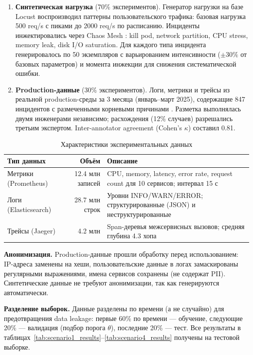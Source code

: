 \begin{enumerate}
    \item \textbf{Синтетическая нагрузка} (70\% экспериментов). Генератор нагрузки на базе Locust воспроизводил паттерны пользовательского трафика: базовая нагрузка 500 req/s с пиками до 2000 req/s по расписанию. Инциденты инжектировались через Chaos Mesh \cite{chaos_engineering}: kill pod, network partition, CPU stress, memory leak, disk I/O saturation. Для каждого типа инцидента генерировалось по 50 экземпляров с варьированием интенсивности ($\pm 30\%$ от базовых параметров) и момента инжекции для снижения систематической ошибки.

    \item \textbf{Production-данные} (30\% экспериментов). Логи, метрики и трейсы из реальной production-среды за 3 месяца (январь--март 2025), содержащие 847 инцидентов с размеченными корневыми причинами \cite{aiops_survey}. Разметка выполнялась двумя инженерами независимо; расхождения (12\% случаев) разрешались третьим экспертом. Inter-annotator agreement (Cohen's $\kappa$) составил 0.81.
\end{enumerate}

\begin{table}[H]
\centering
\caption{Характеристики экспериментальных данных}
\label{tab:data_description}
\begin{tabular}{|l|r|p{5.5cm}|}
\hline
\textbf{Тип данных} & \textbf{Объём} & \textbf{Описание} \\
\hline
Метрики (Prometheus) & 12.4 млн записей & CPU, memory, latency, error rate, request count для 10 сервисов; интервал 15 с \\
\hline
Логи (Elasticsearch) & 28.7 млн строк & Уровни INFO/WARN/ERROR; структурированные (JSON) и неструктурированные \\
\hline
Трейсы (Jaeger) & 4.2 млн & Span-деревья межсервисных вызовов; средняя глубина 4.3 хопа \\
\hline
\end{tabular}
\end{table}

\textbf{Анонимизация.} Production-данные прошли обработку перед использованием: IP-адреса заменены на хеши, пользовательские данные в логах замаскированы регулярными выражениями, имена сервисов сохранены (не содержат PII). Синтетические данные не требуют анонимизации, так как генерируются автоматически.

\textbf{Разделение выборок.} Данные разделены по времени (а не случайно) для предотвращения data leakage: первые 60\% по времени --- обучение, следующие 20\% --- валидация (подбор порога $\theta$), последние 20\% --- тест. Все результаты в таблицах~\ref{tab:scenario1_results}--\ref{tab:scenario4_results} получены на тестовой выборке.

